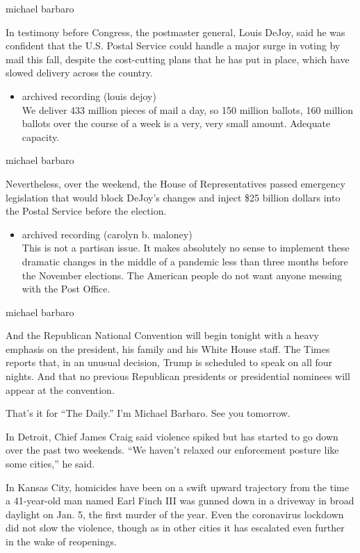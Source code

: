 michael barbaro

In testimony before Congress, the postmaster general, Louis DeJoy, said
he was confident that the U.S. Postal Service could handle a major surge
in voting by mail this fall, despite the cost-cutting plans that he has
put in place, which have slowed delivery across the country.

\begin{itemize}
\tightlist
\item
  archived recording (louis dejoy)\\
  We deliver 433 million pieces of mail a day, so 150 million ballots,
  160 million ballots over the course of a week is a very, very small
  amount. Adequate capacity.
\end{itemize}

michael barbaro

Nevertheless, over the weekend, the House of Representatives passed
emergency legislation that would block DeJoy's changes and inject \$25
billion dollars into the Postal Service before the election.

\begin{itemize}
\tightlist
\item
  archived recording (carolyn b. maloney)\\
  This is not a partisan issue. It makes absolutely no sense to
  implement these dramatic changes in the middle of a pandemic less than
  three months before the November elections. The American people do not
  want anyone messing with the Post Office.
\end{itemize}

michael barbaro

And the Republican National Convention will begin tonight with a heavy
emphasis on the president, his family and his White House staff. The
Times reports that, in an unusual decision, Trump is scheduled to speak
on all four nights. And that no previous Republican presidents or
presidential nominees will appear at the convention.

That's it for ``The Daily.'' I'm Michael Barbaro. See you tomorrow.

In Detroit, Chief James Craig said violence spiked but has started to go
down over the past two weekends. ``We haven't relaxed our enforcement
posture like some cities,'' he said.

In Kansas City, homicides have been on a swift upward trajectory from
the time a 41-year-old man named Earl Finch III was gunned down in a
driveway in broad daylight on Jan. 5, the first murder of the year. Even
the coronavirus lockdown did not slow the violence, though as in other
cities it has escalated even further in the wake of reopenings.

